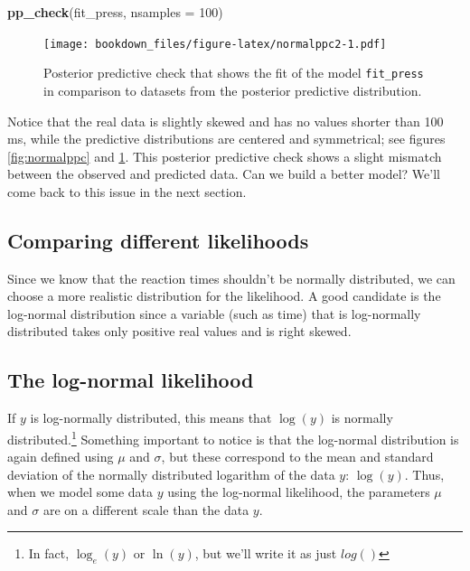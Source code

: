 \documentclass[12pt,]{krantz}
\newenvironment{Shaded}{\begin{snugshade}}{\end{snugshade}}
\newcommand{\DataTypeTok}[1]{\textcolor[rgb]{0.13,0.29,0.53}{#1}}
\newcommand{\DecValTok}[1]{\textcolor[rgb]{0.00,0.00,0.81}{#1}}
\newcommand{\KeywordTok}[1]{\textcolor[rgb]{0.13,0.29,0.53}{\textbf{#1}}}
\newcommand{\NormalTok}[1]{#1}
\theoremstyle{definition}
\theoremstyle{definition}
\theoremstyle{definition}
\theoremstyle{remark}
\begin{document}
\begin{Shaded}
\begin{Highlighting}[]
\KeywordTok{pp_check}\NormalTok{(fit_press, }\DataTypeTok{nsamples =} \DecValTok{100}\NormalTok{)}
\end{Highlighting}
\end{Shaded}

\begin{figure}
\centering
\texttt{[image: bookdown\_files/figure-latex/normalppc2-1.pdf]}
\caption{\label{fig:normalppc2}Posterior predictive check that shows the fit of the model \texttt{fit\_press} in comparison to datasets from the posterior predictive distribution.}
\end{figure}

Notice that the real data is slightly skewed and has no values shorter than 100 ms, while the predictive distributions are centered and symmetrical; see figures \ref{fig:normalppc} and \ref{fig:normalppc2}. This posterior predictive check shows a slight mismatch between the observed and predicted data. Can we build a better model? We'll come back to this issue in the next section.

\hypertarget{comparing-different-likelihoods}{%
\subsection{Comparing different likelihoods}\label{comparing-different-likelihoods}}

Since we know that the reaction times shouldn't be normally distributed, we can choose a more realistic distribution for the likelihood. A good candidate is the log-normal distribution since a variable (such as time) that is log-normally distributed takes only positive real values and is right skewed.

\hypertarget{sec:lnfirst}{%
\subsection{The log-normal likelihood}\label{sec:lnfirst}}

If \(y\) is log-normally distributed, this means that \(\log(y)\) is normally distributed.\footnote{In fact, \(\log_e(y)\) or \(\ln(y)\), but we'll write it as just \(log()\)} Something important to notice is that the log-normal distribution is again defined using \(\mu\) and \(\sigma\), but these correspond to the mean and standard deviation of the normally distributed logarithm of the data \(y\): \(\log(y)\). Thus, when we model some data \(y\) using the log-normal likelihood, the parameters \(\mu\) and \(\sigma\) are on a different scale than the data \(y\).
\end{document}
